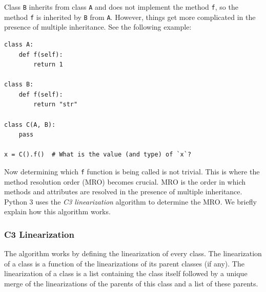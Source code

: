 Class \lstinline|B| inherits from class \lstinline|A| and does not implement the method \lstinline|f|, so the method \lstinline|f| is inherited by \lstinline|B| from \lstinline|A|. However, things get more complicated in the presence of multiple inheritance. See the following example:

\begin{lstlisting}
class A:
	def f(self):
		return 1

class B:
	def f(self):
		return "str"
		
class C(A, B):
	pass
	
x = C().f()  # What is the value (and type) of `x`?
\end{lstlisting}

Now determining which \lstinline|f| function is being called is not trivial. This is where the method resolution order (MRO) becomes crucial. MRO is the order in which methods and attributes are resolved in the presence of multiple inheritance. Python 3 uses the \textit{C3 linearization} algorithm to determine the MRO. We briefly explain how this algorithm works.

\subsubsection{C3 Linearization}
The algorithm works by defining the linearization of every class. The linearization of a class is a function of the linearizations of its parent classes (if any). The linearization of a class is a list containing the class itself followed by a unique merge of the linearizations of the parents of this class and a list of these parents.

